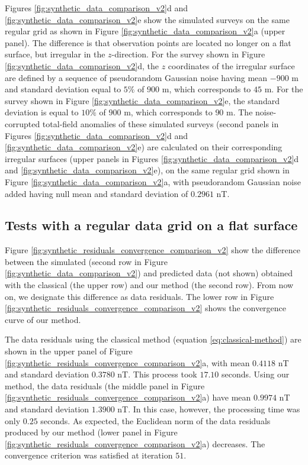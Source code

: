 \documentclass[manuscript,noblind]{geophysics}
\begin{document}

Figures \ref{fig:synthetic_data_comparison_v2}d and \ref{fig:synthetic_data_comparison_v2}e 
show the simulated surveys on the same regular grid as shown in Figure 
\ref{fig:synthetic_data_comparison_v2}a (upper panel). The difference is that observation points
are located no longer on a flat surface, but irregular in the $z$-direction.
For the survey shown in Figure \ref{fig:synthetic_data_comparison_v2}d, the $z$ coordinates 
of the irregular surface are defined by a sequence of pseudorandom Gaussian noise having mean 
$-900$ m and standard deviation equal to $5\%$ of $900$ m, which corresponds to $45$ m.
For the survey shown in Figure \ref{fig:synthetic_data_comparison_v2}e, the standard deviation 
is equal to $10\%$ of $900$ m, which corresponds to $90$ m.
The noise-corrupted total-field anomalies of these simulated surveys (second panels in Figures 
\ref{fig:synthetic_data_comparison_v2}d and \ref{fig:synthetic_data_comparison_v2}e) are calculated 
on their corresponding irregular surfaces (upper panels in Figures 
\ref{fig:synthetic_data_comparison_v2}d and \ref{fig:synthetic_data_comparison_v2}e),
on the same regular grid shown in Figure \ref{fig:synthetic_data_comparison_v2}a,
with pseudorandom Gaussian noise added having null mean and standard deviation of $0.2961$ nT.


\subsection*{Tests with a regular data grid on a flat surface}

Figure \ref{fig:synthetic_residuals_convergence_comparison_v2} show the 
difference between the simulated (second row in Figure \ref{fig:synthetic_data_comparison_v2})
and predicted data (not shown) obtained with the classical (the upper row) and 
our method (the second row). From now on, we designate this difference as data residuals. 
The lower row in Figure \ref{fig:synthetic_residuals_convergence_comparison_v2} shows the 
convergence curve of our method.

The data residuals using the classical method (equation \ref{eq:classical-method})  
are shown in the upper panel of Figure \ref{fig:synthetic_residuals_convergence_comparison_v2}a, 
with mean $0.4118$ nT and standard deviation $0.3780$ nT. This process took $17.10$ seconds.
Using our method, the data residuals (the middle panel in Figure
\ref{fig:synthetic_residuals_convergence_comparison_v2}a) have mean $0.9974$ nT and standard
deviation $1.3900$ nT. In this case, however, the processing time was only $0.25$ seconds.
As expected, the Euclidean norm of the data residuals produced by our method 
(lower panel in Figure \ref{fig:synthetic_residuals_convergence_comparison_v2}a) decreases. 
The convergence criterion was satisfied at iteration $51$.
\end{document}
